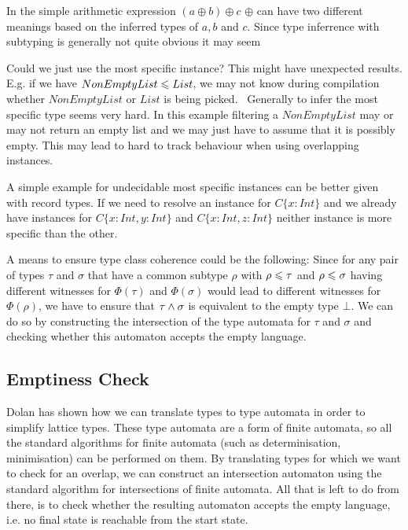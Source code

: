   In the simple arithmetic expression $(a \oplus b) \oplus c$ $\oplus$ can have two different meanings based on the inferred types of $a,b$ and $c$.
  Since type inferrence with subtyping is generally not quite obvious it may seem 

  Could we just use the most specific instance? This might have unexpected results.
  E.g. if we have $NonEmptyList \leqslant List$, we may not know during compilation whether $NonEmptyList$ or $List$ is being picked.
  ~Generally to infer the most specific type seems very hard. In this example filtering a $NonEmptyList$ may or may not return an empty list and we may just have to assume that it is possibly empty.
  This may lead to hard to track behaviour when using overlapping instances.

  A simple example for undecidable most specific instances can be better given with record types.
  If we need to resolve an instance for $C \{x : Int\}$ and we already have instances for $C \{x : Int, y : Int\}$ and $C \{x : Int, z : Int\}$ neither instance is more specific than the other.

  
  A means to ensure type class coherence could be the following:
  Since for any pair of types $\tau$ and $\sigma$ that have a common subtype $\rho$ with $\rho \leqslant \tau$ and $\rho \leqslant \sigma$ having different witnesses for $\Phi(\tau)$ and $\Phi(\sigma)$ would lead to different witnesses for $\Phi(\rho)$,
  we have to ensure that $\tau \wedge \sigma$ is equivalent to the empty type $\bot$.
  We can do so by constructing the intersection of the type automata for $\tau$ and $\sigma$ and checking whether this automaton accepts the empty language.

  \subsection{Emptiness Check}

  Dolan \cite{downen2017phd} has shown how we can translate types to type automata in order to simplify lattice types.
  These type automata are a form of finite automata, so all the standard algorithms for finite automata (such as determinisation, minimisation) can be performed on them.
  By translating types for which we want to check for an overlap, we can construct an intersection automaton using the standard algorithm for intersections of finite automata.
  All that is left to do from there, is to check whether the resulting automaton accepts the empty language,  i.e. no final state is reachable from the start state.

